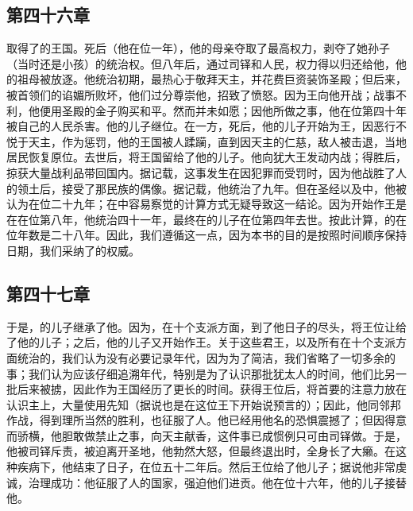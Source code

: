 
\subsection{第四十六章}

取得了的王国。死后（他在位一年），他的母亲夺取了最高权力，剥夺了她孙子（当时还是小孩）的统治权。但八年后，通过司铎和人民，权力得以归还给他，他的祖母被放逐。他统治初期，最热心于敬拜天主，并花费巨资装饰圣殿；但后来，被首领们的谄媚所败坏，他们过分尊崇他，招致了愤怒。因为王向他开战；战事不利，他便用圣殿的金子购买和平。然而并未如愿；因他所做之事，他在位第四十年被自己的人民杀害。他的儿子继位。在一方，死后，他的儿子开始为王，因恶行不悦于天主，作为惩罚，他的王国被人蹂躏，直到因天主的仁慈，敌人被击退，当地居民恢复原位。去世后，将王国留给了他的儿子。他向犹大王发动内战；得胜后，掠获大量战利品带回国内。据记载，这事发生在因犯罪而受罚时，因为他战胜了人的领土后，接受了那民族的偶像。据记载，他统治了九年。但在圣经以及中，他被认为在位二十九年；在中容易察觉的计算方式无疑导致这一结论。因为开始作王是在在位第八年，他统治四十一年，最终在的儿子在位第四年去世。按此计算，的在位年数是二十八年。因此，我们遵循这一点，因为本书的目的是按照时间顺序保持日期，我们采纳了的权威。\par


\subsection{第四十七章}

于是，的儿子继承了他。因为，在十个支派方面，到了他日子的尽头，将王位让给了他的儿子；之后，他的儿子又开始作王。关于这些君王，以及所有在十个支派方面统治的，我们认为没有必要记录年代，因为为了简洁，我们省略了一切多余的事；我们认为应该仔细追溯年代，特别是为了认识那批犹太人的时间，他们比另一批后来被掳，因此作为王国经历了更长的时间。获得王位后，将首要的注意力放在认识主上，大量使用先知（据说也是在这位王下开始说预言的）；因此，他同邻邦作战，得到理所当然的胜利，也征服了人。他已经用他名的恐惧震撼了；但因得意而骄横，他胆敢做禁止之事，向天主献香，这件事已成惯例只可由司铎做。于是，他被司铎斥责，被迫离开圣地，他勃然大怒，但最终退出时，全身长了大癞。在这种疾病下，他结束了日子，在位五十二年后。然后王位给了他儿子；据说他非常虔诚，治理成功：他征服了人的国家，强迫他们进贡。他在位十六年，他的儿子接替他。\par


